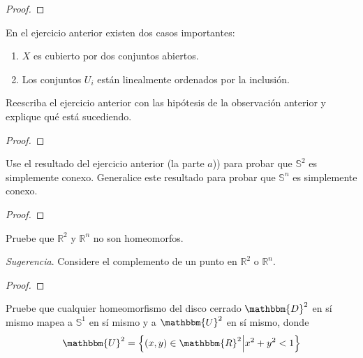 \documentclass[12pt]{report}
\theoremstyle{largebreak}
\newcommand{\bbm}[1]{\ensuremath{\mathbbm{#1}}}
\begin{document}
    \begin{proof}
        
    \end{proof}

    \begin{obs}
        En el ejercicio anterior existen dos casos importantes:
        \begin{enumerate}
            \item $X$ es cubierto por dos conjuntos abiertos.
            \item Los conjuntos $U_i$ están linealmente ordenados por la inclusión.
        \end{enumerate}
    \end{obs}

    \begin{excer}
        Reescriba el ejercicio anterior con las hipótesis de la observación anterior y explique qué está sucediendo.
    \end{excer}

    \begin{proof}
        
    \end{proof}

    \begin{excer}
        Use el resultado del ejercicio anterior (la parte $a$)) para probar que $\mathbb{S}^2$ es simplemente conexo. Generalice este resultado para probar que $\mathbb{S}^n$ es simplemente conexo.
    \end{excer}

    \begin{proof}
        
    \end{proof}

    \begin{excer}
        Pruebe que $\mathbb{R}^2$ y $\mathbb{R}^n$ no son homeomorfos.

        \textit{Sugerencia}. Considere el complemento de un punto en $\mathbb{R}^2$ o $\mathbb{R}^n$.
    \end{excer}

    \begin{proof}
        
    \end{proof}

    \begin{excer}
        Pruebe que cualquier homeomorfismo del disco cerrado $\bbm{D}^2$ en sí mismo mapea a $\mathbb{S}^1$ en sí mismo y a $\bbm{U}^2$ en sí mismo, donde
        \begin{equation*}
            \bbm{U}^2=\left\{(x,y)\in\bbm{R}^2\Big|x^2+y^2<1 \right\}
        \end{equation*}
    \end{excer}
\end{document}
